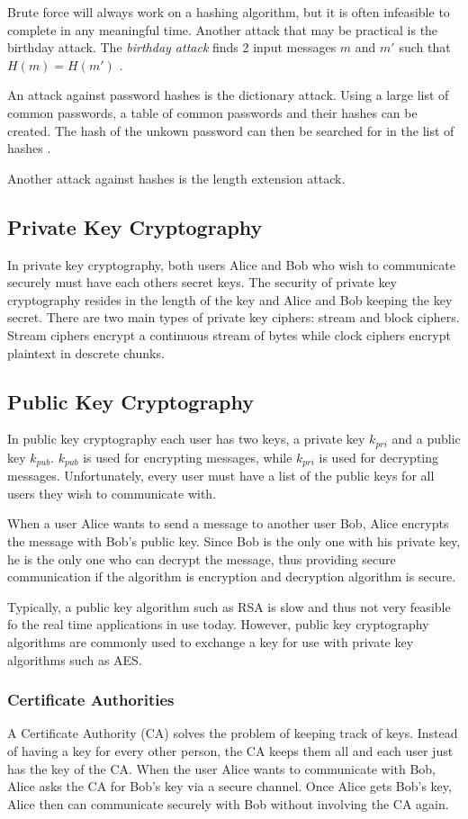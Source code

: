 \documentclass[12pt]{article}
\begin{document}
Brute force will always work on a hashing algorithm, but it is often infeasible to complete in any meaningful time. Another attack that may be practical is the birthday attack. The \textit{birthday attack} finds 2 input messages $m$ and $m'$ such that $H(m)=H(m')$ \cite{appcrypt}.

An attack against password hashes is the dictionary attack. Using a large list of common passwords, a table of common passwords and their hashes can be created. The hash of the unkown password can then be searched for in the list of hashes \cite[pg. 52]{appcrypt}.

Another attack against hashes is the length extension attack. 

\subsection{Private Key Cryptography}
In private key cryptography, both users Alice and Bob who wish to communicate securely must have each others secret keys. The security of private key cryptography resides in the length of the key and Alice and Bob keeping the key secret. There are two main types of private key ciphers: stream and block ciphers. Stream ciphers encrypt a continuous stream of bytes while clock ciphers encrypt plaintext in descrete chunks.

\subsection{Public Key Cryptography}
In public key cryptography each user has two keys, a private key $k_{pri}$ and a public key $k_{pub}$. $k_{pub}$ is used for encrypting messages, while $k_{pri}$ is used for decrypting messages. Unfortunately, every user must have a list of the public keys for all users they wish to communicate with.

When a user Alice wants to send a message to another user Bob, Alice encrypts the message with Bob's public key. Since Bob is the only one with his private key, he is the only one who can decrypt the message, thus providing secure communication if the algorithm is encryption and decryption algorithm is secure.

Typically, a public key algorithm such as RSA is slow and thus not very feasible fo the real time applications in use today. However, public key cryptography algorithms are commonly used to exchange a key for use with private key algorithms such as AES.

\subsubsection{Certificate Authorities}
A Certificate Authority (CA) solves the problem of keeping track of keys. Instead of having a key for every other person, the CA keeps them all and each user just has the key of the CA. When the user Alice wants to communicate with Bob, Alice asks the CA for Bob's key via a secure channel. Once Alice gets Bob's key, Alice then can communicate securely with Bob without involving the CA again.
\end{document}
